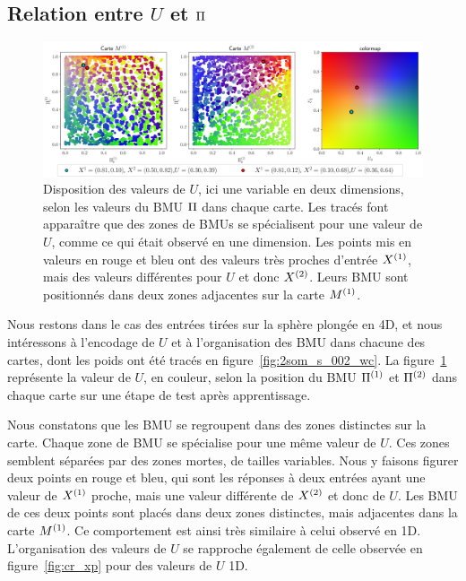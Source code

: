 \documentclass[../main]{subfiles}
\begin{document}
\subsection{Relation entre $U$ et $\Pi$ \label{par:U_bmu2D}}

\begin{figure}[t]
	\includegraphics[width=\textwidth]{U_BMU_2SOM_2D.png}
	\caption{Disposition des valeurs de $U$, ici une variable en deux dimensions, selon les valeurs du BMU $\Pi$ dans chaque carte. Les tracés font apparaître que des zones de BMUs se spécialisent pour une valeur de $U$, comme ce qui était observé en une dimension. Les points mis en valeurs en rouge et bleu ont des valeurs très proches d'entrée $X^{({1})}$, mais des valeurs différentes pour $U$ et donc $X^{({2})}$. Leurs BMU sont positionnés dans deux zones adjacentes sur la carte $M^{({1})}$.
	\label{fig:U_BMU}}
\end{figure}

Nous restons dans le cas des entrées tirées sur la sphère plongée en 4D, et nous intéressons à l'encodage de $U$ et à l'organisation des BMU dans chacune des cartes, dont les poids ont été tracés en figure~\ref{fig:2som_s_002_wc}.
La figure~\ref{fig:U_BMU} représente la valeur de $U$, en couleur, selon la position du BMU $\Pi^{({1})}$ et $\Pi^{({2})}$ dans chaque carte sur une étape de test après apprentissage.

Nous constatons que les BMU se regroupent dans des zones distinctes sur la carte. Chaque zone de BMU se spécialise pour une même valeur de $U$. Ces zones semblent séparées par des zones mortes, de tailles variables.
Nous y faisons figurer deux points en rouge et bleu, qui sont les réponses à deux entrées ayant une valeur de $X^{({1})}$ proche, mais une valeur différente de $X^{({2})}$ et donc de $U$.
Les BMU de ces deux points sont placés dans deux zones distinctes, mais adjacentes dans la carte $M^{({1})}$. Ce comportement est ainsi très similaire à celui observé en 1D. 
L'organisation des valeurs de $U$ se rapproche également de celle observée en figure~\ref{fig:cr_xp} pour des valeurs de $U$ 1D.
\end{document}
